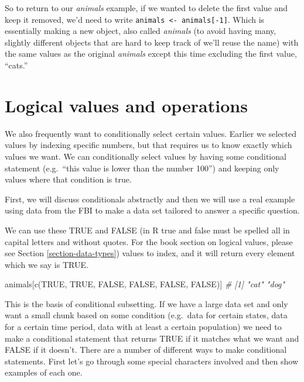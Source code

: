 \documentclass[
]{krantz}
\makeatletter
\newenvironment{Shaded}{\begin{snugshade}}{\end{snugshade}}
\newcommand{\CommentTok}[1]{\textcolor[rgb]{0.37,0.37,0.37}{\textit{#1}}}
\newcommand{\ConstantTok}[1]{\textcolor[rgb]{0,0,0}{#1}}
\newcommand{\FunctionTok}[1]{\textcolor[rgb]{0,0,0}{#1}}
\newcommand{\NormalTok}[1]{#1}
\newenvironment{kframe}{%
\medskip{}
\setlength{\fboxsep}{.8em}
 \def\at@end@of@kframe{}%
 \ifinner\ifhmode%
  \def\at@end@of@kframe{\end{minipage}}%
  \begin{minipage}{\columnwidth}%
 \fi\fi%
 \def\FrameCommand##1{\hskip\@totalleftmargin \hskip-\fboxsep
 \colorbox{shadecolor}{##1}\hskip-\fboxsep
     \hskip-\linewidth \hskip-\@totalleftmargin \hskip\columnwidth}%
 \MakeFramed {\advance\hsize-\width
   \@totalleftmargin\z@ \linewidth\hsize
   \@setminipage}}%
 {\par\unskip\endMakeFramed%
 \at@end@of@kframe}
\renewenvironment{Shaded}{\begin{kframe}}{\end{kframe}}
\makeatother
\begin{document}
So to return to our \emph{animals} example, if we wanted to
delete the first value and keep it removed, we'd need to
write \texttt{animals\ \textless{}-\ animals{[}-1{]}}. Which
is essentially making a new object, also called
\emph{animals} (to avoid having many, slightly different
objects that are hard to keep track of we'll reuse the name)
with the same values as the original \emph{animals} except
this time excluding the first value, ``cats.''

\hypertarget{logical-values-and-operations}{%
\section{Logical values and
operations}\label{logical-values-and-operations}}

We also frequently want to conditionally select certain
values. Earlier we selected values by indexing specific
numbers, but that requires us to know exactly which values
we want. We can conditionally select values by having some
conditional statement (e.g.~``this value is lower than the
number 100'') and keeping only values where that condition
is true.

First, we will discuss conditionals abstractly and then we
will use a real example using data from the FBI to make a
data set tailored to answer a specific question.

We can use these TRUE and FALSE (in R true and false must be
spelled all in capital letters and without quotes. For the
book section on logical values, please see Section
\ref{section-data-types}) values to index, and it will
return every element which we say is TRUE.

\begin{Shaded}
\begin{Highlighting}[]
\NormalTok{animals[}\FunctionTok{c}\NormalTok{(}\ConstantTok{TRUE}\NormalTok{, }\ConstantTok{TRUE}\NormalTok{, }\ConstantTok{FALSE}\NormalTok{, }\ConstantTok{FALSE}\NormalTok{, }\ConstantTok{FALSE}\NormalTok{, }\ConstantTok{FALSE}\NormalTok{)]}
\CommentTok{\# [1] "cat" "dog"}
\end{Highlighting}
\end{Shaded}

This is the basis of conditional subsetting. If we have a
large data set and only want a small chunk based on some
condition (e.g.~data for certain states, data for a certain
time period, data with at least a certain population) we
need to make a conditional statement that returns TRUE if it
matches what we want and FALSE if it doesn't. There are a
number of different ways to make conditional statements.
First let's go through some special characters involved and
then show examples of each one.
\end{document}
